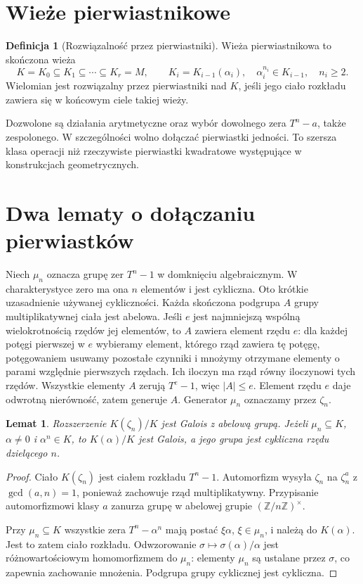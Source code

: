 \documentclass[11pt,a4paper,oneside]{book}
\numberwithin{equation}{section}
\theoremstyle{plain}
\newtheorem{lemat}[twierdzenie]{Lemat}
\theoremstyle{definition}
\newtheorem{definicja}[twierdzenie]{Definicja}
\theoremstyle{remark}
\newcommand{\Z}{\mathbb{Z}}
\begin{document}
\section{Wieże pierwiastnikowe}

\begin{definicja}[Rozwiązalność przez pierwiastniki]
Wieża pierwiastnikowa to skończona wieża
\[
K=K_0\subseteq K_1\subseteq\cdots\subseteq K_r=M,\qquad
K_i=K_{i-1}(\alpha_i),\quad \alpha_i^{n_i}\in K_{i-1},\quad n_i\ge2.
\]
Wielomian jest rozwiązalny przez pierwiastniki nad $K$, jeśli jego ciało rozkładu zawiera się w końcowym ciele takiej wieży.
\end{definicja}

Dozwolone są działania arytmetyczne oraz wybór dowolnego zera $T^n-a$, także zespolonego. W szczególności wolno dołączać pierwiastki jedności. To szersza klasa operacji niż rzeczywiste pierwiastki kwadratowe występujące w konstrukcjach geometrycznych.

\section{Dwa lematy o dołączaniu pierwiastków}

Niech $\mu_n$ oznacza grupę zer $T^n-1$ w domknięciu algebraicznym. W charakterystyce zero ma ona $n$ elementów i jest cykliczna. Oto krótkie uzasadnienie używanej cykliczności. Każda skończona podgrupa $A$ grupy multiplikatywnej ciała jest abelowa. Jeśli $e$ jest najmniejszą wspólną wielokrotnością rzędów jej elementów, to $A$ zawiera element rzędu $e$: dla każdej potęgi pierwszej w $e$ wybieramy element, którego rząd zawiera tę potęgę, potęgowaniem usuwamy pozostałe czynniki i mnożymy otrzymane elementy o parami względnie pierwszych rzędach. Ich iloczyn ma rząd równy iloczynowi tych rzędów. Wszystkie elementy $A$ zerują $T^e-1$, więc $|A|\le e$. Element rzędu $e$ daje odwrotną nierówność, zatem generuje $A$. Generator $\mu_n$ oznaczamy przez $\zeta_n$.

\begin{lemat}
Rozszerzenie $K(\zeta_n)/K$ jest Galois z abelową grupą. Jeżeli $\mu_n\subseteq K$, $\alpha\ne0$ i $\alpha^n\in K$, to $K(\alpha)/K$ jest Galois, a jego grupa jest cykliczna rzędu dzielącego $n$.
\end{lemat}
\begin{proof}
Ciało $K(\zeta_n)$ jest ciałem rozkładu $T^n-1$. Automorfizm wysyła $\zeta_n$ na $\zeta_n^a$ z $\gcd(a,n)=1$, ponieważ zachowuje rząd multiplikatywny. Przypisanie automorfizmowi klasy $a$ zanurza grupę w abelowej grupie $(\Z/n\Z)^\times$.

Przy $\mu_n\subseteq K$ wszystkie zera $T^n-\alpha^n$ mają postać $\xi\alpha$, $\xi\in\mu_n$, i należą do $K(\alpha)$. Jest to zatem ciało rozkładu. Odwzorowanie $\sigma\mapsto\sigma(\alpha)/\alpha$ jest różnowartościowym homomorfizmem do $\mu_n$: elementy $\mu_n$ są ustalane przez $\sigma$, co zapewnia zachowanie mnożenia. Podgrupa grupy cyklicznej jest cykliczna.
\end{proof}
\end{document}
